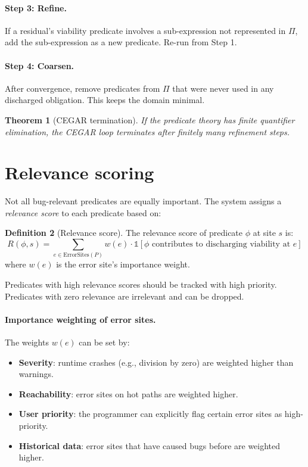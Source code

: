 \documentclass[11pt]{report}
\theoremstyle{definition}
\newtheorem{definition}{Definition}[section]
\theoremstyle{plain}
\newtheorem{theorem}[definition]{Theorem}
\begin{document}
\paragraph{Step 3: Refine.}
If a residual's viability predicate involves a sub-expression not represented
in $\Pi$, add the sub-expression as a new predicate. Re-run from Step 1.

\paragraph{Step 4: Coarsen.}
After convergence, remove predicates from $\Pi$ that were never used in
any discharged obligation. This keeps the domain minimal.

\begin{theorem}[CEGAR termination]
If the predicate theory has finite quantifier elimination, the CEGAR loop
terminates after finitely many refinement steps.
\end{theorem}

\section{Relevance scoring}

Not all bug-relevant predicates are equally important. The system assigns a
\emph{relevance score} to each predicate based on:

\begin{definition}[Relevance score]
The relevance score of predicate $\phi$ at site $s$ is:
\[
  R(\phi, s) = \sum_{e \in \mathrm{ErrorSites}(P)} w(e) \cdot
    \mathbb{1}[\phi \text{ contributes to discharging viability at } e]
\]
where $w(e)$ is the error site's importance weight.
\end{definition}

Predicates with high relevance scores should be tracked with high priority.
Predicates with zero relevance are irrelevant and can be dropped.

\paragraph{Importance weighting of error sites.}
The weights $w(e)$ can be set by:
\begin{itemize}[nosep]
  \item \textbf{Severity}: runtime crashes (e.g., division by zero) are
        weighted higher than warnings.
  \item \textbf{Reachability}: error sites on hot paths are weighted higher.
  \item \textbf{User priority}: the programmer can explicitly flag certain
        error sites as high-priority.
  \item \textbf{Historical data}: error sites that have caused bugs before
        are weighted higher.
\end{itemize}
\end{document}
